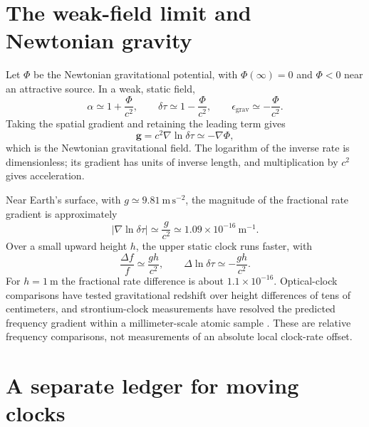 \documentclass[12pt]{article}
\begin{document}
\section{The weak-field limit and Newtonian gravity}

Let $\Phi$ be the Newtonian gravitational potential, with $\Phi(\infty)=0$ and $\Phi<0$ near an attractive source. In a weak, static field,
\begin{equation}
  \alpha\simeq1+\frac{\Phi}{c^2},
  \qquad
  \delta\tau\simeq1-\frac{\Phi}{c^2},
  \qquad
  \epsilon_{\mathrm{grav}}\simeq-\frac{\Phi}{c^2}.
  \label{eq:weak-rate}
\end{equation}
Taking the spatial gradient and retaining the leading term gives
\begin{equation}
  \mathbf{g}=c^2\nabla\ln\delta\tau
  \simeq-\nabla\Phi,
  \label{eq:newtonian-limit}
\end{equation}
which is the Newtonian gravitational field. The logarithm of the inverse rate is dimensionless; its gradient has units of inverse length, and multiplication by $c^2$ gives acceleration.

Near Earth's surface, with $g\simeq9.81\ \mathrm{m\,s^{-2}}$, the magnitude of the fractional rate gradient is approximately
\begin{equation}
  \left|\nabla\ln\delta\tau\right|
  \simeq\frac{g}{c^2}
  \simeq1.09\times10^{-16}\ \mathrm{m^{-1}}.
  \label{eq:earth-gradient}
\end{equation}
Over a small upward height $h$, the upper static clock runs faster, with
\begin{equation}
  \frac{\Delta f}{f}\simeq\frac{gh}{c^2},
  \qquad
  \Delta\ln\delta\tau\simeq-\frac{gh}{c^2}.
  \label{eq:height-redshift}
\end{equation}
For $h=1\ \mathrm{m}$ the fractional rate difference is about $1.1\times10^{-16}$. Optical-clock comparisons have tested gravitational redshift over height differences of tens of centimeters, and strontium-clock measurements have resolved the predicted frequency gradient within a millimeter-scale atomic sample \cite{Chou,Bothwell}. These are relative frequency comparisons, not measurements of an absolute local clock-rate offset.

\section{A separate ledger for moving clocks}
\end{document}
